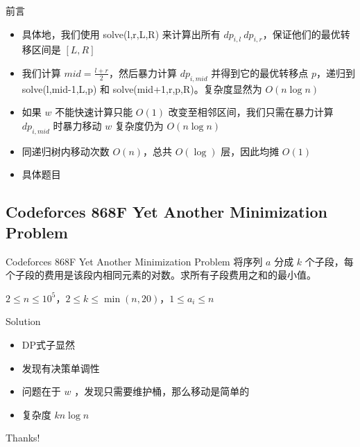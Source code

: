 ﻿\documentclass[aspectratio=169]{ctexbeamer}
\begin{document}
\begin{frame}{前言}
    \begin{itemize}
        \item 具体地，我们使用 solve(l,r,L,R) 来计算出所有 $dp_{i,l}~dp_{i,r}$，保证他们的最优转移区间是 $[L,R]$
        \item 我们计算 $mid=\frac{l+r}{2}$，然后暴力计算 $dp_{i,mid}$ 并得到它的最优转移点 $p$，递归到 solve(l,mid-1,L,p) 和 solve(mid+1,r,p,R)。复杂度显然为 $O(n\log n)$
        \item 如果 $w$ 不能快速计算只能 $O(1)$ 改变至相邻区间，我们只需在暴力计算 $dp_{i,mid}$ 时暴力移动 $w$ 复杂度仍为 $O(n\log n)$
        \item 同递归树内移动次数 $O(n)$，总共 $O(\log)$ 层，因此均摊 $O(1)$
        \item 具体题目
    \end{itemize}
\end{frame}

\subsection{Codeforces 868F Yet Another Minimization Problem}

\begin{frame}{Codeforces 868F Yet Another Minimization Problem}
      将序列 $a$ 分成 $k$ 个子段，每个子段的费用是该段内相同元素的对数。求所有子段费用之和的最小值。
      
      $2\le n\le 10^5$，$2\le k\le \min(n,20)$，$1\le a_i\le n$
\end{frame}

\begin{frame}{Solution}
    \begin{itemize}
        \item DP式子显然
        \item 发现有决策单调性
        \item 问题在于 $w$ ，发现只需要维护桶，那么移动是简单的
        \item 复杂度 $kn\log n$
    \end{itemize}
\end{frame}







\begin{frame}
    \begin{center}
        {\Huge\calligra Thanks!}
    \end{center}
\end{frame}
\end{document}
